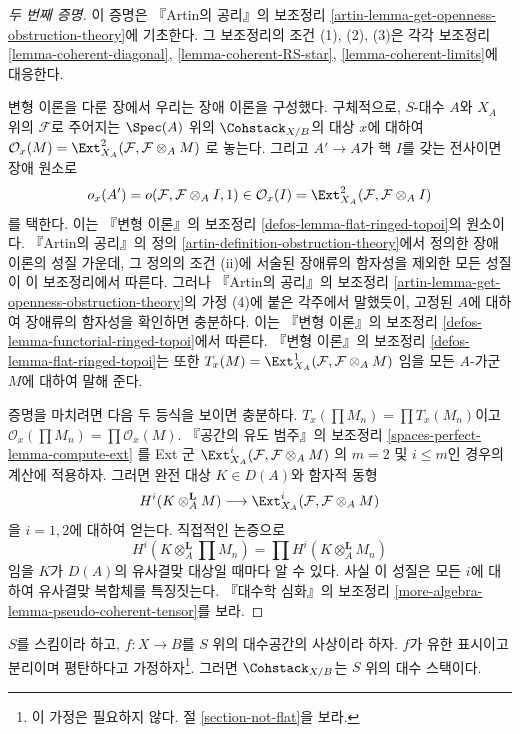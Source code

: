 \begin{proof}[두 번째 증명]
이 증명은 『Artin의 공리』의 보조정리
\ref{artin-lemma-get-openness-obstruction-theory}에 기초한다.
그 보조정리의 조건 (1), (2), (3)은 각각 보조정리
\ref{lemma-coherent-diagonal},
\ref{lemma-coherent-RS-star},
\ref{lemma-coherent-limits}에 대응한다.

\medskip\noindent
변형 이론을 다룬 장에서 우리는 장애 이론을 구성했다.
구체적으로, $S$-대수 $A$와 $X_A$ 위의 $\mathcal{F}$로 주어지는
$\Spec(A)$ 위의 $\Cohstack_{X/B}$의 대상 $x$에 대하여
$\mathcal{O}_x(M) = \Ext^2_{X_A}(\mathcal{F}, \mathcal{F} \otimes_A M)$
로 놓는다. 그리고 $A' \to A$가 핵 $I$를 갖는 전사이면 장애 원소로
$$
o_x(A') = o(\mathcal{F}, \mathcal{F} \otimes_A I, 1) \in
\mathcal{O}_x(I) = \Ext^2_{X_A}(\mathcal{F}, \mathcal{F} \otimes_A I)
$$
를 택한다. 이는 『변형 이론』의 보조정리
\ref{defos-lemma-flat-ringed-topoi}의 원소이다.
『Artin의 공리』의 정의 \ref{artin-definition-obstruction-theory}에서
정의한 장애 이론의 성질 가운데, 그 정의의 조건 (ii)에 서술된
장애류의 함자성을 제외한 모든 성질이 이 보조정리에서 따른다.
그러나 『Artin의 공리』의 보조정리
\ref{artin-lemma-get-openness-obstruction-theory}의 가정 (4)에 붙은
각주에서 말했듯이, 고정된 $A$에 대하여 장애류의 함자성을 확인하면 충분하다.
이는 『변형 이론』의 보조정리
\ref{defos-lemma-functorial-ringed-topoi}에서 따른다.
『변형 이론』의 보조정리 \ref{defos-lemma-flat-ringed-topoi}는 또한
$T_x(M) = \Ext^1_{X_A}(\mathcal{F}, \mathcal{F} \otimes_A M)$
임을 모든 $A$-가군 $M$에 대하여 말해 준다.

\medskip\noindent
증명을 마치려면 다음 두 등식을 보이면 충분하다.
$T_x(\prod M_n) = \prod T_x(M_n)$이고
$\mathcal{O}_x(\prod M_n) = \prod \mathcal{O}_x(M)$.
『공간의 유도 범주』의 보조정리
\ref{spaces-perfect-lemma-compute-ext}
를 Ext 군
$\Ext^i_{X_A}(\mathcal{F}, \mathcal{F} \otimes_A M)$
의 $m = 2$ 및 $i \leq m$인 경우의 계산에 적용하자. 그러면
완전 대상 $K \in D(A)$와 함자적 동형
$$
H^i(K \otimes_A^\mathbf{L} M)
\longrightarrow
\Ext^i_{X_A}(\mathcal{F}, \mathcal{F} \otimes_A M)
$$
을 $i = 1, 2$에 대하여 얻는다. 직접적인 논증으로
$$
H^i(K \otimes_A^\mathbf{L} \prod M_n) =
\prod H^i(K \otimes_A^\mathbf{L} M_n)
$$
임을 $K$가 $D(A)$의 유사결맞 대상일 때마다 알 수 있다.
사실 이 성질은 모든 $i$에 대하여 유사결맞 복합체를 특징짓는다.
『대수학 심화』의 보조정리
\ref{more-algebra-lemma-pseudo-coherent-tensor}를 보라.
\end{proof}

\begin{theorem}
\label{theorem-coherent-algebraic}
$S$를 스킴이라 하고, $f : X \to B$를 $S$ 위의 대수공간의 사상이라 하자.
$f$가 유한 표시이고 분리이며 평탄하다고 가정하자\footnote{이 가정은
필요하지 않다. 절 \ref{section-not-flat}을 보라.}.
그러면 $\Cohstack_{X/B}$는 $S$ 위의 대수 스택이다.
\end{theorem}

